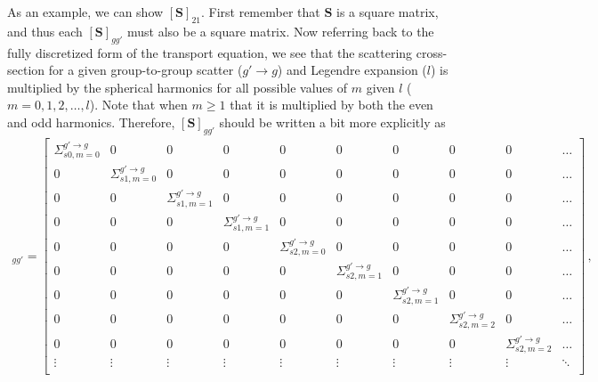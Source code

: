 \documentclass[10pt]{article}
\begin{document}
As an example, we can show $[\textbf{S}]_{21}$. First remember that $\textbf{S}$ is a square matrix, and thus each $[\textbf{S}]_{gg'}$ must also be a square matrix. Now referring back to the fully discretized form of the transport equation, we see that the scattering cross-section for a given group-to-group scatter ($g' \rightarrow g$) and Legendre expansion ($l$) is multiplied by the spherical harmonics for all possible values of $m$ given $l$ ($m=0,1,2,\dots,l$). Note that when $m \geq 1$ that it is multiplied by both the even and odd harmonics. Therefore, $[\textbf{S}]_{gg'}$ should be written a bit more explicitly as
%
\begin{align*}
[\textbf{S}]_{gg'} = 
\begin{bmatrix}
	\Sigma_{s0,m=0}^{g' \rightarrow g} & 0 & 0 & 0 & 0 & 0 & 0 & 0 & 0 & \dots \\
	0 & \Sigma_{s1,m=0}^{g' \rightarrow g} & 0 & 0 & 0 & 0 & 0 & 0 & 0 & \dots \\
	0 & 0 & \Sigma_{s1,m=1}^{g' \rightarrow g} & 0 & 0 & 0 & 0 & 0 & 0 & \dots \\
	0 & 0 & 0 & \Sigma_{s1,m=1}^{g' \rightarrow g} & 0 & 0 & 0 & 0 & 0 & \dots \\
	0 & 0 & 0 & 0 & \Sigma_{s2,m=0}^{g' \rightarrow g} & 0 & 0 & 0 & 0 & \dots \\
	0 & 0 & 0 & 0 & 0 & \Sigma_{s2,m=1}^{g' \rightarrow g} & 0 & 0 & 0 & \dots \\
	0 & 0 & 0 & 0 & 0 & 0 & \Sigma_{s2,m=1}^{g' \rightarrow g} & 0 & 0 & \dots \\
	0 & 0 & 0 & 0 & 0 & 0 & 0 & \Sigma_{s2,m=2}^{g' \rightarrow g} & 0 & \dots \\
	0 & 0 & 0 & 0 & 0 & 0 & 0 & 0 & \Sigma_{s2,m=2}^{g' \rightarrow g} & \dots \\
	\vdots & \vdots & \vdots & \vdots & \vdots & \vdots & \vdots & \vdots & \vdots &  \ddots \\
\end{bmatrix}\,,
\end{align*}
\end{document}
